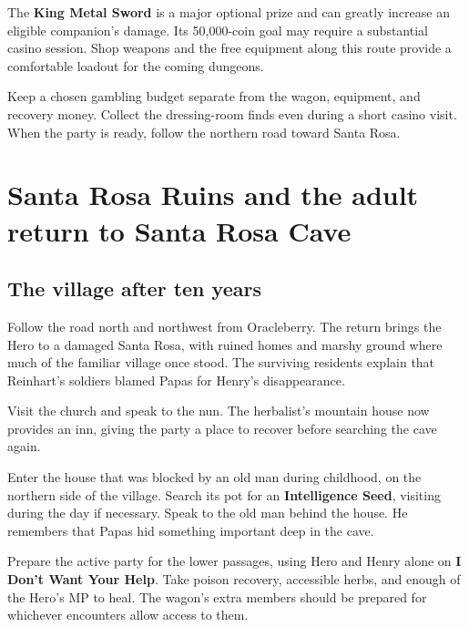 The \textbf{King Metal Sword} is a major optional prize and can greatly
increase an eligible companion's damage. Its 50,000-coin goal may require
a substantial casino session. Shop weapons and the free equipment along
this route provide a comfortable loadout for the coming dungeons.


Keep a chosen gambling budget separate from the wagon, equipment, and
recovery money. Collect the dressing-room finds even during a short
casino visit. When the party is ready, follow the northern road toward
Santa Rosa.

\section{Santa Rosa Ruins and the adult return to Santa Rosa Cave}

\subsection*{The village after ten years}

Follow the road north and northwest from Oracleberry. The return brings
the Hero to a damaged Santa Rosa, with ruined homes and marshy ground
where much of the familiar village once stood. The surviving residents
explain that Reinhart's soldiers blamed Papas for Henry's disappearance.

Visit the church and speak to the nun. The herbalist's mountain house
now provides an inn, giving the party a place to recover before searching
the cave again.

Enter the house that was blocked by an old man during childhood, on the
northern side of the village. Search its pot for an
\textbf{Intelligence Seed}, visiting during the day if necessary.
Speak to the old man behind the house. He remembers that Papas hid
something important deep in the cave.

Prepare the active party for the lower passages, using Hero and Henry
alone on \textbf{I Don't Want Your Help}. Take poison recovery,
accessible herbs, and enough of the Hero's MP to heal. The wagon's
extra members should be prepared for whichever encounters allow access
to them.

